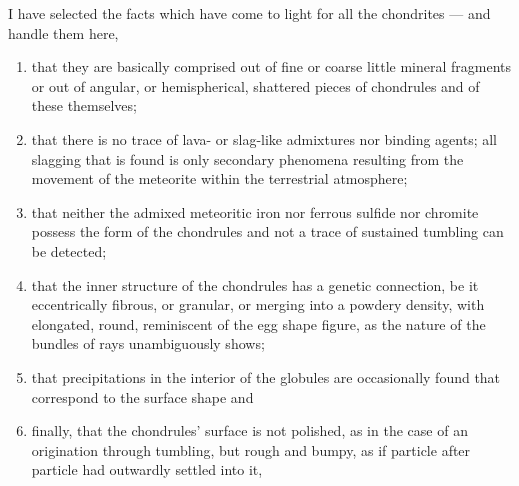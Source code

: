 \documentclass[a4paper, 12pt, oneside]{article}
\begin{document}
I have selected the facts which have come to light for all the chondrites --- and handle them here,
\begin{enumerate}
    \item that they are basically comprised out of fine or coarse little mineral fragments or out of angular, or hemispherical, shattered pieces of chondrules and of these themselves;
    \item that there is no trace of lava- or slag-like admixtures nor binding agents; all slagging that is found is only secondary phenomena resulting from the movement of the meteorite within the terrestrial atmosphere;
    \item that neither the admixed meteoritic iron nor ferrous sulfide nor chromite possess the form of the chondrules and not a trace of sustained tumbling can be detected;
    \item that the inner structure of the chondrules has a genetic connection, be it eccentrically fibrous, or granular, or merging into a powdery density, with elongated, round, reminiscent of the egg shape figure, as the nature of the bundles of rays unambiguously shows;
    \item that precipitations in the interior of the globules are occasionally found that correspond to the surface shape and
    \item finally, that the chondrules' surface is not polished, as in the case of an origination through tumbling, but rough and bumpy, as if particle after particle had outwardly settled into it,
\end{enumerate}
\end{document}
